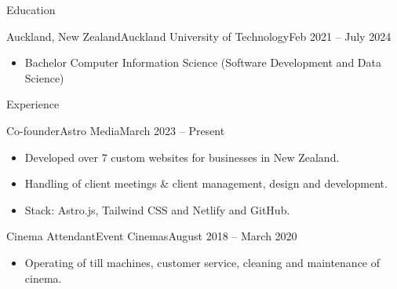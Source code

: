 \documentclass[]{mcdowellcv}
\begin{document}
    \makeheader
    
    \begin{cvsection}{Education}
        \begin{cvsubsection}{Auckland, New Zealand}{Auckland University of Technology}{Feb 2021 -- July 2024}
            \begin{itemize}
				
				\vspace{0.22cm}
                \item Bachelor Computer Information Science (Software Development and Data Science)
            \end{itemize}
        \end{cvsubsection}
    \end{cvsection}
    
    \begin{cvsection}{Experience}
        
        \begin{cvsubsection}{Co-founder}{Astro Media}{March 2023 -- Present}    
            \begin{itemize}
                \item Developed over 7 custom websites for businesses in New Zealand. 
                \item Handling of client meetings & client management, design and development.
                \item Stack: Astro.js, Tailwind CSS and Netlify and GitHub.
            \end{itemize}
        \end{cvsubsection}
        
        \begin{cvsubsection}{Cinema Attendant}{Event Cinemas}{August 2018 -- March 2020}        
            \begin{itemize}
                \item Operating of till machines, customer service, cleaning and maintenance of cinema.
             
            \end{itemize}
        \end{cvsubsection}
        
       
    \end{cvsection}
    
\end{document}
